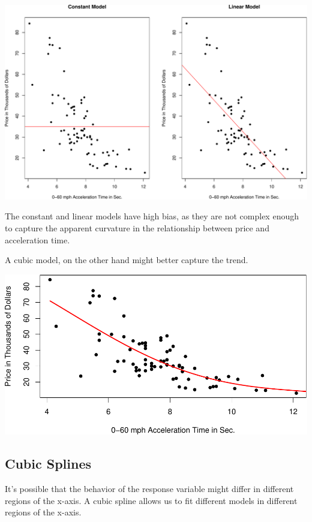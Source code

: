 \documentclass[
  letterpaper,
  DIV=11,
  numbers=noendperiod]{scrreprt}
\begin{document}
\includegraphics{Ch7_files/figure-pdf/unnamed-chunk-67-1.pdf}

The constant and linear models have high bias, as they are not complex
enough to capture the apparent curvature in the relationship between
price and acceleration time.

A cubic model, on the other hand might better capture the trend.

\includegraphics{Ch7_files/figure-pdf/unnamed-chunk-68-1.pdf}

\subsection{Cubic Splines}\label{cubic-splines}

It's possible that the behavior of the response variable might differ in
different regions of the x-axis. A cubic spline allows us to fit
different models in different regions of the x-axis.
\end{document}
